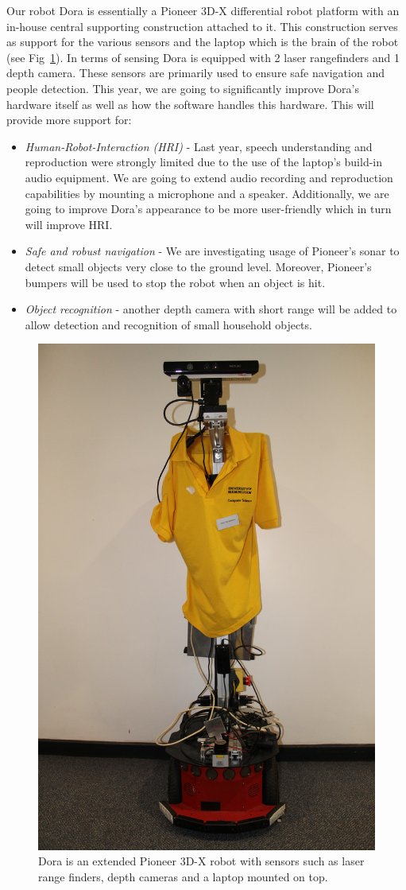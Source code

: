 Our robot Dora is essentially a Pioneer 3D-X differential robot platform with an in-house central supporting construction attached to it. This construction serves as support for the various sensors and the laptop which is the brain of the robot (see Fig~\ref{fig:dora}). In terms of sensing Dora is equipped with 2 laser rangefinders and 1 depth camera. These sensors are primarily used to ensure safe navigation 
and people detection. This year, we are going to significantly improve Dora's hardware itself as well as how the software handles this hardware. This will provide more support for:

\begin{itemize}
\item \textit{Human-Robot-Interaction (HRI)} - Last year, speech understanding and reproduction were strongly limited due to the use of the laptop's build-in audio equipment. We are going to extend audio recording and reproduction capabilities by mounting a microphone and a speaker. Additionally, we are going to improve Dora's appearance to be more user-friendly which in turn will improve HRI. 
\item \textit{Safe and robust navigation} - We are investigating usage of Pioneer's sonar to detect small objects very close to the ground level. Moreover, Pioneer's bumpers will be used to stop the robot when an object is hit. 
\item \textit{Object recognition} - another depth camera with short range will be added to allow detection and recognition of small household objects.
\end{itemize}
 
\begin{figure}[!htb]
\centering
\includegraphics[width=2.in]{dora_new.png}
\caption{Dora is an extended Pioneer 3D-X robot with sensors such as laser range finders, depth cameras and a laptop mounted on top.}
\label{fig:dora}
\end{figure}  


